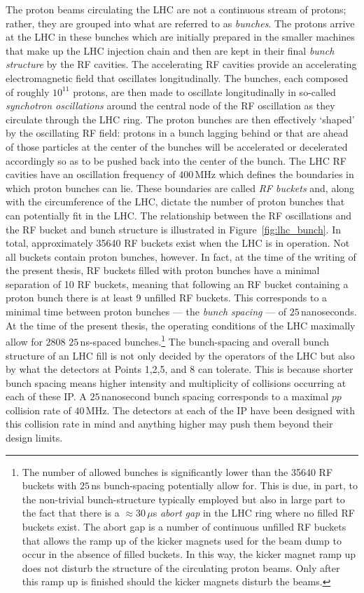 The proton beams circulating the LHC are not a continuous stream of protons; rather,
they are grouped into what are referred to as \textit{bunches}.
The protons arrive at the LHC in these bunches which are initially prepared
in the smaller machines that make up the LHC injection chain and then are
kept in their final \textit{bunch structure} by the RF cavities.
The accelerating RF cavities provide an accelerating electromagnetic field
that oscillates longitudinally. The bunches, each composed of roughly $10^{11}$ protons,
are then made to oscillate longitudinally in so-called \textit{synchotron oscillations}
around the central node of the RF oscillation as they circulate through the LHC ring.
The proton bunches are then effectively `shaped' by the oscillating RF field: protons in a bunch
lagging behind or that are ahead of those particles at the center of the bunches
will be accelerated or decelerated accordingly so as to be pushed back into the center of the bunch.
The LHC RF cavities have an oscillation frequency of $400$\,MHz which
defines the boundaries in which proton bunches can lie. These boundaries are
called \textit{RF buckets} and, along with
the circumference of the LHC, dictate the number of proton bunches that
can potentially fit in the LHC.
The relationship between the RF oscillations and the RF bucket and bunch structure
is illustrated in Figure~\ref{fig:lhc_bunch}.
In total, approximately 35640 RF buckets exist when the LHC is in operation.
Not all buckets contain proton bunches, however.
In fact, at the time of the writing of the present thesis,
RF buckets filled with proton bunches have a minimal separation of 10 RF buckets, meaning
that following an RF bucket containing a proton bunch there is at least 9 unfilled RF buckets.
This corresponds to a minimal
time between proton bunches --- the \textit{bunch spacing} --- of $25$\,nanoseconds.
At the time of the present thesis, the operating conditions of the LHC maximally
allow for 2808 $25$\,ns-spaced bunches.\footnote{
The number of allowed bunches is significantly lower than the 35640 RF buckets with $25$\,ns
bunch-spacing potentially allow for. This is due, in part, to the non-trivial bunch-structure
typically employed but also in large part to the fact that there is a $\approx 30\,\mu$s \textit{abort gap}
in the LHC ring where no filled RF buckets exist.
The abort gap is a number of continuous unfilled RF buckets that allows the ramp up of the kicker
magnets used for the beam dump to occur in the absence of filled buckets.
In this way, the kicker magnet ramp up does not disturb the structure of the circulating proton beams.
Only after this ramp up is finished should the kicker magnets disturb the beams.
}
The bunch-spacing and overall bunch structure of an LHC fill is not only decided
by the operators of the LHC but also by what the detectors at Points 1,2,5, and 8
can tolerate. This is because shorter bunch spacing means higher intensity and multiplicity
of collisions occurring at each of these IP. A $25$\,nanosecond bunch spacing
corresponds to a maximal $pp$ collision rate of $40$\,MHz. The detectors at each
of the IP have been designed with this collision rate in mind and anything
higher may push them beyond their design limits.

